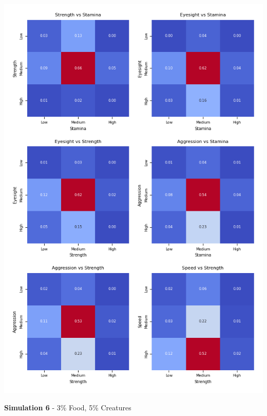 \documentclass{article}
\begin{document}
\begin{center}
    \includegraphics[scale=0.9]{tests/5_confusion_matrices.png}
\end{center}
\textbf{Simulation 6} - 3\% Food, 5\% Creatures
\end{document}
